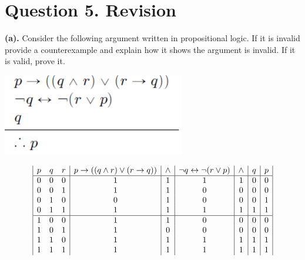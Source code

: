 \documentclass[a4paper]{article}
\begin{document}
\newpage

\section{Question 5. Revision}
\textbf{(a).} Consider the following argument written in propositional logic. If it is invalid provide a counterexample and explain how it shows the argument is invalid. If it is valid, prove it.\\
\begin{center}
    \includegraphics[width=0.6\textwidth]{images/5a.png}\\[1cm]
\end{center}

\begin{displaymath}
    \begin{array}{|c c c|c|c|c|c|c|c|}
        p & q & r & p \rightarrow ((q \wedge r) \vee (r \rightarrow q)) & \wedge & \neg q \leftrightarrow \neg (r \vee p) & \wedge & q & p \\
        \hline
        0 & 0 & 0 & 1                                                   & 1      & 1                                      & 1      & 0 & 0 \\
        0 & 0 & 1 & 1                                                   & 1      & 0                                      & 0      & 0 & 0 \\
        0 & 1 & 0 & 0                                                   & 1      & 0                                      & 0      & 0 & 1 \\
        0 & 1 & 1 & 1                                                   & 1      & 1                                      & 1      & 1 & 1 \\
        \hline
        1 & 0 & 0 & 1                                                   & 1      & 0                                      & 0      & 0 & 0 \\
        1 & 0 & 1 & 1                                                   & 0      & 0                                      & 0      & 0 & 0 \\
        1 & 1 & 0 & 1                                                   & 1      & 1                                      & 1      & 1 & 1 \\
        1 & 1 & 1 & 1                                                   & 1      & 1                                      & 1      & 1 & 1 \\
    \end{array}
\end{displaymath}
\end{document}
